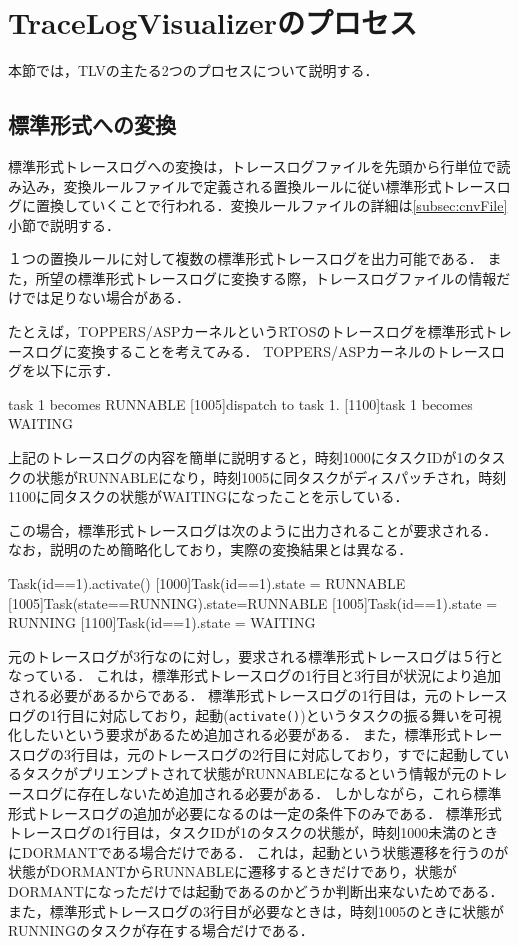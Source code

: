 \section{TraceLogVisualizerのプロセス}

本節では，TLVの主たる2つのプロセスについて説明する．

\subsection{標準形式への変換}

標準形式トレースログへの変換は，トレースログファイルを先頭から行単位で読み込み，変換ルールファイルで定義される置換ルールに従い標準形式トレースログに置換していくことで行われる．変換ルールファイルの詳細は\ref{subsec:cnvFile}小節で説明する．

１つの置換ルールに対して複数の標準形式トレースログを出力可能である．
また，所望の標準形式トレースログに変換する際，トレースログファイルの情報だけでは足りない場合がある．

たとえば，TOPPERS/ASPカーネルというRTOSのトレースログを標準形式トレースログに変換することを考えてみる．
TOPPERS/ASPカーネルのトレースログを以下に示す．

\begin{EBNF}
[1000]task 1 becomes RUNNABLE
[1005]dispatch to task 1.
[1100]task 1 becomes WAITING
\end{EBNF}

上記のトレースログの内容を簡単に説明すると，時刻1000にタスクIDが1のタスクの状態がRUNNABLEになり，時刻1005に同タスクがディスパッチされ，時刻1100に同タスクの状態がWAITINGになったことを示している．

この場合，標準形式トレースログは次のように出力されることが要求される．
なお，説明のため簡略化しており，実際の変換結果とは異なる．

\begin{EBNF}
[1000]Task(id==1).activate()
[1000]Task(id==1).state = RUNNABLE
[1005]Task(state==RUNNING).state=RUNNABLE
[1005]Task(id==1).state = RUNNING
[1100]Task(id==1).state = WAITING
\end{EBNF}

元のトレースログが3行なのに対し，要求される標準形式トレースログは５行となっている．
これは，標準形式トレースログの1行目と3行目が状況により追加される必要があるからである．
標準形式トレースログの1行目は，元のトレースログの1行目に対応しており，起動(\verb|activate()|)というタスクの振る舞いを可視化したいという要求があるため追加される必要がある．
また，標準形式トレースログの3行目は，元のトレースログの2行目に対応しており，すでに起動しているタスクがプリエンプトされて状態がRUNNABLEになるという情報が元のトレースログに存在しないため追加される必要がある．
しかしながら，これら標準形式トレースログの追加が必要になるのは一定の条件下のみである．
標準形式トレースログの1行目は，タスクIDが1のタスクの状態が，時刻1000未満のときにDORMANTである場合だけである．
これは，起動という状態遷移を行うのが状態がDORMANTからRUNNABLEに遷移するときだけであり，状態がDORMANTになっただけでは起動であるのかどうか判断出来ないためである．
また，標準形式トレースログの3行目が必要なときは，時刻1005のときに状態がRUNNINGのタスクが存在する場合だけである．

